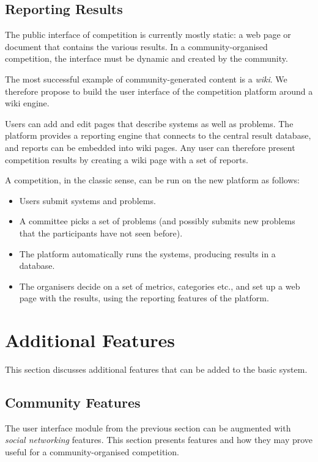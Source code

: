 \subsection{Reporting Results}

The public interface of competition is currently mostly static: a web page or document that contains the various results. In a community-organised competition, the interface must be dynamic and created by the community.

The most successful example of community-generated content is a \emph{wiki}. We therefore propose to build the user interface of the competition platform around a wiki engine.

Users can add and edit pages that describe systems as well as problems. The platform provides a reporting engine that connects to the central result database, and reports can be embedded into wiki pages. Any user can therefore present competition results by creating a wiki page with a set of reports.

A competition, in the classic sense, can be run on the new platform as follows:
\begin{itemize}
  \item Users submit systems and problems.
  \item A committee picks a set of problems (and possibly submits new problems that the participants have not seen before).
  \item The platform automatically runs the systems, producing results in a database.
  \item The organisers decide on a set of metrics, categories etc., and set up a web page with the results, using the reporting features of the platform.
\end{itemize}

\section{Additional Features}
\label{sec:additional_features}

This section discusses additional features that can be added to the basic system.

\subsection{Community Features}

The user interface module from the previous section can be augmented with \emph{social networking} features. This section presents features and how they may prove useful for a community-organised competition.

